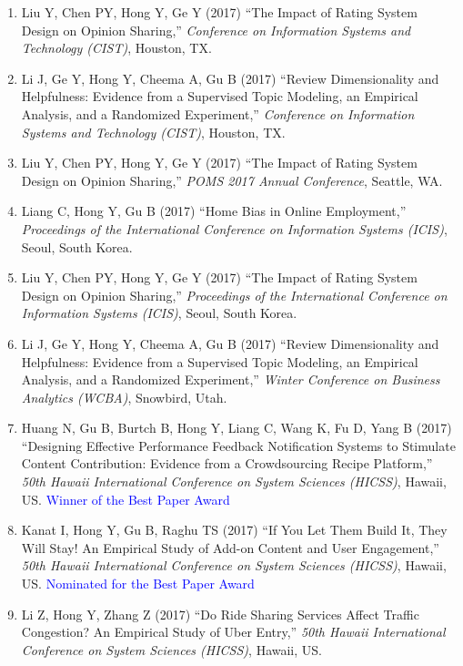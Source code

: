 \documentclass[paper=letter,fontsize=10pt]{scrartcl} %
\newcommand{\ConfEntry}[6]{
		\noindent #1 (#2) ``#3,'' \textit{#4}, #5. \textcolor{blue}{#6}}
\newcommand{\Hong}{Hong Y}
\begin{document}
\begin{enumerate}
\item \ConfEntry{Liu Y, Chen PY, \Hong, Ge Y}{2017}{The Impact of Rating System Design on Opinion Sharing}{Conference on Information Systems and Technology (CIST)}{Houston, TX}{}

\item \ConfEntry{Li J, Ge Y, \Hong, Cheema A, Gu B}{2017}{Review Dimensionality and Helpfulness: Evidence from a Supervised Topic Modeling, an Empirical Analysis, and a Randomized Experiment}{Conference on Information Systems and Technology (CIST)}{Houston, TX}{}

\item \ConfEntry{Liu Y, Chen PY, \Hong, Ge Y}{2017}{The Impact of Rating System Design on Opinion Sharing}{POMS 2017 Annual Conference}{Seattle, WA}{}

\item \ConfEntry{Liang C, \Hong, Gu B}{2017}{Home Bias in Online Employment}{Proceedings of the International Conference on Information Systems (ICIS)}{Seoul, South Korea}{}

\item \ConfEntry{Liu Y, Chen PY, \Hong, Ge Y}{2017}{The Impact of Rating System Design on Opinion Sharing}{Proceedings of the International Conference on Information Systems (ICIS)}{Seoul, South Korea}{}

\item \ConfEntry{Li J, Ge Y, \Hong, Cheema A, Gu B}{2017}{Review Dimensionality and Helpfulness: Evidence from a Supervised Topic Modeling, an Empirical Analysis, and a Randomized Experiment}{Winter Conference on Business Analytics (WCBA)}{Snowbird, Utah}{}

\item \ConfEntry{Huang N, Gu B, Burtch B, \Hong, Liang C, Wang K, Fu D, Yang B}{2017}{Designing Effective Performance Feedback Notification Systems to Stimulate Content Contribution: Evidence from a Crowdsourcing Recipe Platform}{50th Hawaii International Conference on System Sciences (HICSS)}{Hawaii, US}{\protect\newline Winner of the Best Paper Award}

\item \ConfEntry{Kanat I, \Hong, Gu B, Raghu TS}{2017}{If You Let Them Build It, They Will Stay! An Empirical Study of Add-on Content and User Engagement}{50th Hawaii International Conference on System Sciences (HICSS)}{Hawaii, US}{\protect\newline Nominated for the Best Paper Award}

\item \ConfEntry{Li Z, \Hong, Zhang Z}{2017}{Do Ride Sharing Services Affect Traffic Congestion? An Empirical Study of Uber Entry}{50th Hawaii International Conference on System Sciences (HICSS)}{Hawaii, US}{}


\end{enumerate}
\end{document}
